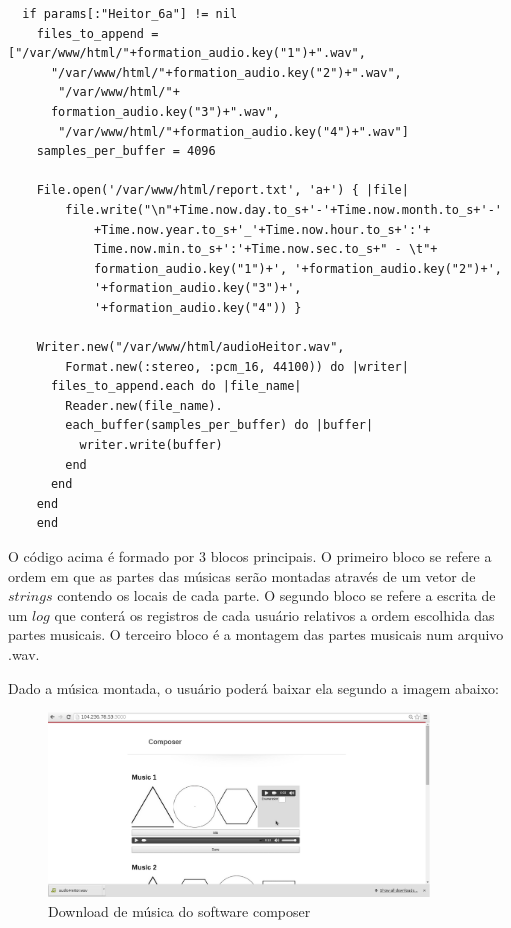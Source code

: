 \begin{lstlisting}
  if params[:"Heitor_6a"] != nil
    files_to_append = ["/var/www/html/"+formation_audio.key("1")+".wav", 
      "/var/www/html/"+formation_audio.key("2")+".wav",
       "/var/www/html/"+
      formation_audio.key("3")+".wav",
       "/var/www/html/"+formation_audio.key("4")+".wav"]
    samples_per_buffer = 4096
    
    File.open('/var/www/html/report.txt', 'a+') { |file| 
    	file.write("\n"+Time.now.day.to_s+'-'+Time.now.month.to_s+'-'
    		+Time.now.year.to_s+'_'+Time.now.hour.to_s+':'+
    		Time.now.min.to_s+':'+Time.now.sec.to_s+" - \t"+
    		formation_audio.key("1")+', '+formation_audio.key("2")+', 
    		'+formation_audio.key("3")+', 
    		'+formation_audio.key("4")) }    

    Writer.new("/var/www/html/audioHeitor.wav", 
    	Format.new(:stereo, :pcm_16, 44100)) do |writer|
      files_to_append.each do |file_name|
        Reader.new(file_name).
        each_buffer(samples_per_buffer) do |buffer|
          writer.write(buffer)
        end
      end
    end
    end
\end{lstlisting}

O código acima é formado por 3 blocos principais. O primeiro bloco se refere a ordem em que as partes das músicas serão montadas através de um vetor de $strings$ contendo os locais de cada parte. O segundo bloco se refere a escrita de um $log$ que conterá os registros de cada usuário relativos a ordem escolhida das partes musicais. O terceiro bloco é a montagem das partes musicais num arquivo .wav.

Dado a música montada, o usuário poderá baixar ela segundo a imagem abaixo:

\begin{figure}[h!]
        \centering
        \includegraphics[width=0.9\textwidth]{figuras/composer_2.eps}
        \caption{Download de música do software composer}
        \label{fig:cronograma}
\end{figure}

